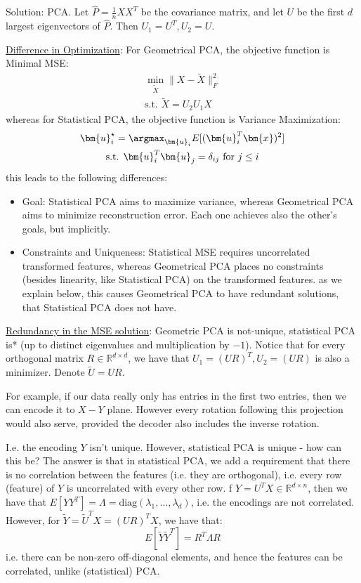 \documentclass{article}
\begin{document}
Solution: PCA. Let $\hat{P} = \frac{1}{n} X X^{T}$ be the covariance matrix, and let $U$ be the first $d$ largest eigenvectors of $\hat{P}$. Then $U_1 = U ^{T}, U_2 = U$.

\ul{Difference in Optimization}: For Geometrical PCA, the objective function is Minimal MSE:
\begin{gather*}
  \min_{\widetilde{X}} \lVert X - \widetilde{X} \rVert _F ^2 \\
  \text{s.t. } \widetilde{X} = U_{2}U_{1}X 
\end{gather*}
whereas for Statistical PCA, the objective function is Variance Maximization:
\begin{gather*}
  \bm{u}_{i} ^{\star} = \argmax_{\bm{u}_i} E[(\bm{u}_i ^{T} \bm{x})^2]   \\
  \text{s.t. } \bm{u}_i ^{T} \bm{u}_{j} = \delta_{ij} \text{ for } j \leq i
\end{gather*}
this leads to the following differences:
\begin{itemize}

  \item Goal: Statistical PCA aims to maximize variance, whereas Geometrical PCA aims to minimize reconstruction error. Each one achieves also the other's goals, but implicitly. 
  \item Constraints and Uniqueness: Statistical MSE requires uncorrelated transformed features, whereas Geometrical PCA places no constraints (besides linearity, like Statistical PCA) on the transformed features. as we explain below, this causes Geometrical PCA to have redundant solutions, that Statistical PCA does not have.
\end{itemize}

\ul{Redundancy in the MSE solution}: Geometric PCA is not-unique, statistical PCA is* (up to distinct eigenvalues and multiplication by $-1$).  Notice that for every orthogonal matrix $R \in \mathbb{R}^{d \times d}$, we have that $U_1 = (UR)^{T}, U_2 = (UR)$ is also a minimizer.  Denote $\widetilde{U}=UR$. 

For example, if our data really only has entries in the first two entries, then we can encode it to $X-Y$ plane. 
However every rotation following this projection would also serve, provided the decoder also includes the inverse rotation. 

I.e. the encoding $Y$ isn't unique.  
However, statistical PCA is unique - how can this be? 
The answer is that in statistical PCA, we add a requirement that there is no correlation between the features (i.e. they are orthogonal), i.e. every row (feature) of $Y$ is uncorrelated with every other row. 
 f $Y = U^{T} X \in \mathbb{R}^{d \times  n}$, then we have that $E[Y Y ^{T}] = \Lambda = \text{diag}(\lambda_1, \ldots, \lambda_{d})$, i.e. the encodings are not correlated. 
However, for $\widetilde{Y} = \widetilde{U}^{T} X = (UR)^{T} X$, we have that:
\[
  E[\widetilde{Y} \widetilde{Y}^{T} ] = R^{T} \Lambda R
\]
i.e. there can be non-zero off-diagonal elements, and hence the features can be  correlated, unlike (statistical) PCA. 
\end{document}
